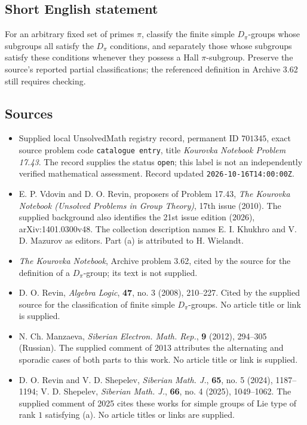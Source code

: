 \documentclass[11pt]{article}
\begin{document}
\subsection{Short English statement}
For an arbitrary fixed set of primes \(\pi\), classify the finite simple \(D_\pi\)-groups whose subgroups all satisfy the \(D_\pi\) conditions, and separately those whose subgroups satisfy these conditions whenever they possess a Hall \(\pi\)-subgroup. Preserve the source's reported partial classifications; the referenced definition in Archive 3.62 still requires checking.
\subsection{Sources}
\begin{itemize}
\item Supplied local UnsolvedMath registry record, permanent ID \(701345\), exact source problem code \texttt{catalogue entry}, title \emph{Kourovka Notebook Problem 17.43}. The record supplies the status \texttt{open}; this label is not an independently verified mathematical assessment. Record updated \texttt{2026-10-16T14:00:00Z}.
\item E. P. Vdovin and D. O. Revin, proposers of Problem 17.43, \emph{The Kourovka Notebook (Unsolved Problems in Group Theory)}, 17th issue (2010). The supplied background also identifies the 21st issue edition (2026), arXiv:1401.0300v48. The collection description names E. I. Khukhro and V. D. Mazurov as editors. Part (a) is attributed to H. Wielandt.
\item \emph{The Kourovka Notebook}, Archive problem 3.62, cited by the source for the definition of a \(D_\pi\)-group; its text is not supplied.
\item D. O. Revin, \emph{Algebra Logic}, \textbf{47}, no. 3 (2008), 210--227. Cited by the supplied source for the classification of finite simple \(D_\pi\)-groups. No article title or link is supplied.
\item N. Ch. Manzaeva, \emph{Siberian Electron. Math. Rep.}, \textbf{9} (2012), 294--305 (Russian). The supplied comment of 2013 attributes the alternating and sporadic cases of both parts to this work. No article title or link is supplied.
\item D. O. Revin and V. D. Shepelev, \emph{Siberian Math. J.}, \textbf{65}, no. 5 (2024), 1187--1194; V. D. Shepelev, \emph{Siberian Math. J.}, \textbf{66}, no. 4 (2025), 1049--1062. The supplied comment of 2025 cites these works for simple groups of Lie type of rank \(1\) satisfying (a). No article titles or links are supplied.
\end{itemize}
\end{document}
